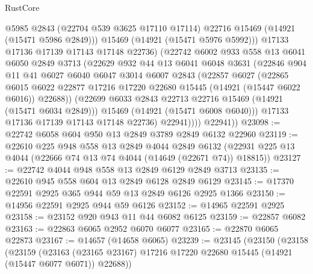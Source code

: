 \begin{lexlean}{RustCore}
\begin{coremodule}
                    @5985
                    @2843
                    (@22704 @539 @3625 @17110 @17114)
                    @22716
                    @15469
                    (@14921 (@15471 @5986 @2849)))
                  @15469
                  (@14921 (@15471 @5976 @5992)))
                @17133
                @17136
                @17139
                @17143
                @17148
                @22736)
              (@22742
                @6002
                @933
                @558
                @13
                @6041
                @6050
                @2849
                @3713
                (@22629
                  @932
                  @44
                  @13
                  @6041
                  @6048
                  @3631
                  (@22846
                    @904
                    @11
                    @41
                    @6027
                    @6040
                    @6047
                    @3014
                    @6007
                    @2843
                    (@22857
                      @6027
                      (@22865
                        @6015
                        @6022
                        @22877
                        @17216
                        @17220
                        @22680
                        @15445
                        (@14921 (@15447 @6022 @6016))
                        @22688))
                    (@22699 @6033 @2843 @22713 @22716 @15469 (@14921 (@15471 @6034 @2849)))
                    @15469
                    (@14921 (@15471 @6008 @6040)))
                  @17133
                  @17136
                  @17139
                  @17143
                  @17148
                  @22736)
                @22941))))
        @22941))
@23098 := @22742 @6058 @604 @950 @13 @2849 @3789 @2849 @6132 @22960
@23119 := @22610
    @225
    @948
    @558
    @13
    @2849
    @4044
    @2849
    @6132
    (@22931 @225 @13 @4044 (@22666 @74 @13 @74 @4044 (@14649 (@22671 @74)) @18815))
@23127 := @22742 @4044 @948 @558 @13 @2849 @6129 @2849 @3713
@23135 := @22610 @945 @558 @604 @13 @2849 @6128 @2849 @6129
@23145 := @17370 @22591 @2925 @365 @944 @59 @13 @2849 @6126 @2925 @1366
@23150 := @14956 @22591 @2925 @944 @59 @6126
@23152 := @14965 @22591 @2925
@23158 := @23152 @920 @943 @11 @44 @6082 @6125
@23159 := @22857 @6082
@23163 := @22863 @6065 @2952 @6070 @6077
@23165 := @22870 @6065 @22873
@23167 := @14657 (@14658 @6065)
@23239 := @23145
    (@23150
      (@23158
        (@23159
          (@23163 (@23165 @23167) @17216 @17220 @22680 @15445 (@14921 (@15447 @6077 @6071)) @22688))

\end{coremodule}
\end{lexlean}
